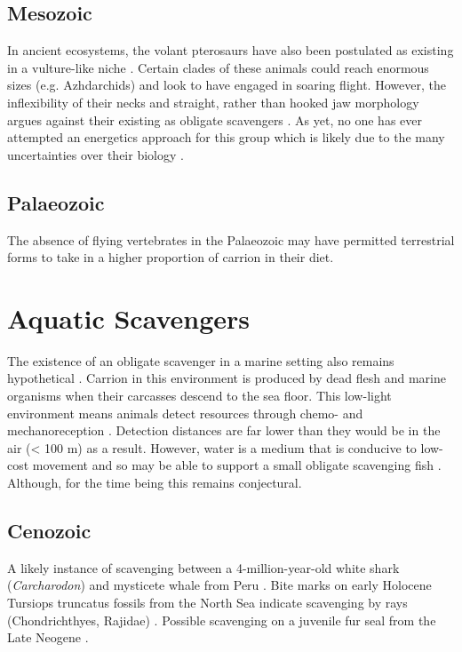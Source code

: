 \documentclass[a4paper,12pt]{article}
\begin{document}
\subsection*{Mesozoic}
In ancient ecosystems, the volant pterosaurs have also been postulated as existing in a vulture-like niche \citep{witton2008reappraisal}. 
Certain clades of these animals could reach enormous sizes (e.g. Azhdarchids) and look to have engaged in soaring flight. 
However, the inflexibility of their necks and straight, rather than hooked jaw morphology argues against their existing as obligate scavengers \citep{witton2008reappraisal}. 
As yet, no one has ever attempted an energetics approach for this group which is likely due to the many uncertainties over their biology \citep{witton2010size}. 

\subsection*{Palaeozoic}
The absence of flying vertebrates in the Palaeozoic may have permitted terrestrial forms to take in a higher proportion of carrion in their diet. 




\section{Aquatic Scavengers}
The existence of an obligate scavenger in a marine setting also remains hypothetical \citep{britton1994marine,smith2003ecology,ruxton2004energetic,ruxton2005searching}. 
Carrion in this environment is produced by dead flesh and marine organisms when their carcasses descend to the sea floor. 
This low-light environment means animals detect resources through chemo- and mechanoreception \citep{ruxton2004energetic}. 
Detection distances are far lower than they would be in the air (< 100 m) as a result. 
However, water is a medium that is conducive to low-cost movement \citep{tucker1975energetic} and so may be able to support a small obligate scavenging fish \citep{ruxton2004energetic,ruxton2005searching}. 
Although, for the time being this remains conjectural.

\subsection*{Cenozoic}
A likely instance of scavenging between a 4-million-year-old white shark (\textit{Carcharodon}) and mysticete whale from Peru \citep{ehret2009caught}.
Bite marks on early Holocene Tursiops truncatus fossils from the North Sea indicate scavenging by rays (Chondrichthyes, Rajidae) \citep{van2009bite}. 
Possible scavenging on a juvenile fur seal from the Late Neogene \citep{boessenecker2011mammalian}. 
\end{document}
